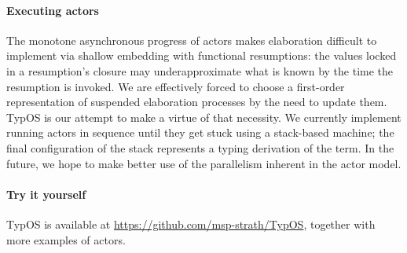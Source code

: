 \documentclass{easychair}
\newcommand{\TypOS}{TypOS\xspace}
\begin{document}
\paragraph{Executing actors}
The monotone asynchronous progress of actors makes elaboration
difficult to implement via shallow embedding with functional
resumptions: the values locked in a resumption's closure may
underapproximate what is known by the time the resumption is invoked.
We are effectively forced to choose a first-order representation of
suspended elaboration processes by the need to update them. \TypOS{}
is our attempt to make a virtue of that necessity.
%
We currently implement running actors in sequence until they get stuck
using a stack-based machine; the final configuration of the stack
represents a typing derivation of the term. In the future, we hope to
make better use of the parallelism inherent in the actor model.


\paragraph{Try it yourself}
\TypOS is available at \url{https://github.com/msp-strath/TypOS}, together with more examples of actors.




\end{document}
